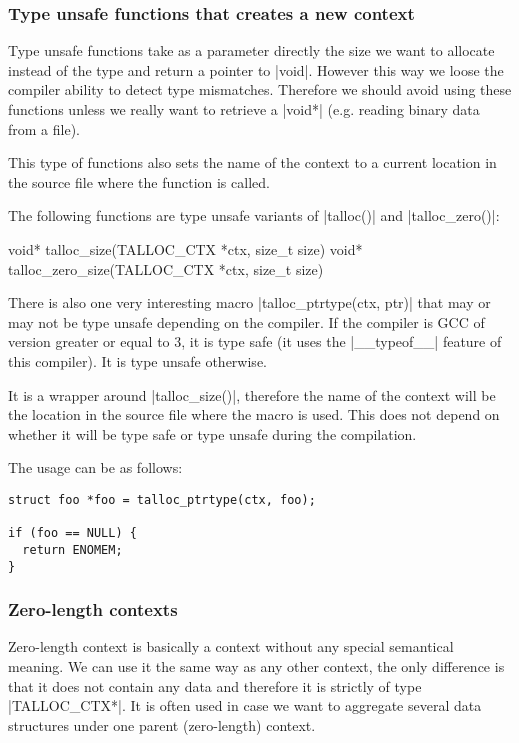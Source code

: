 \subsubsection{Type unsafe functions that creates a new context}

Type unsafe functions take as a parameter directly the size we want to
allocate instead of the type and return a pointer to |void|. However this way
we loose the compiler ability to detect type mismatches. Therefore we should
avoid using these functions unless we really want to retrieve a |void*| (e.g.
reading binary data from a file).

This type of functions also sets the name of the context to a current location
in the source file where the function is called.

The following functions are type unsafe variants of |talloc()| and
|talloc_zero()|:

\begin{funcproto}
void* talloc_size(TALLOC_CTX *ctx, size_t size)
void* talloc_zero_size(TALLOC_CTX *ctx, size_t size)
\end{funcproto}
\funclistend
There is also one very interesting macro |talloc_ptrtype(ctx, ptr)| that may or
may not be type unsafe depending on the compiler. If the compiler is GCC of
version greater or equal to 3, it is type safe (it uses the |__typeof__|
feature of this compiler). It is type unsafe otherwise.

It is a wrapper around |talloc_size()|, therefore the name of the context will
be the location in the source file where the macro is used. This does not depend
on whether it will be type safe or type unsafe during the compilation.

The usage can be as follows:

\begin{lstlisting}[caption={talloc_ptrtype(ctx, ptr)},label=lst:talloc_ptrtype]
struct foo *foo = talloc_ptrtype(ctx, foo);

if (foo == NULL) {
  return ENOMEM;
}

\end{lstlisting}

\subsubsection{Zero-length contexts}

Zero-length context is basically a context without any special semantical
meaning. We can use it the same way as any other context, the only difference is
that it does not contain any data and therefore it is strictly of type
|TALLOC_CTX*|. It is often used in case we want to aggregate several data
structures under one parent (zero-length) context.

